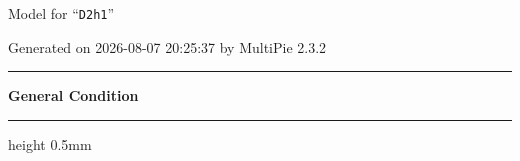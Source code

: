 \documentclass[fleqn,10pt,landscape]{jsarticle}
\begin{document}
\setcounter{MaxMatrixCols}{32}

\renewcommand{\tablename}{Table~}
\renewcommand{\figurename}{Figure~}
\setlength{\baselineskip}{16pt}
\setlength{\parindent}{0pt}
\setlength{\mathindent}{0pt}
\footnotesize
\begin{center}
\LARGE
Model for ``\texttt{D2h1}''
\end{center}
\begin{flushright}
Generated on 2026-08-07 20:25:37 by MultiPie 2.3.2
\end{flushright}
\setlength{\baselineskip}{16pt}
\footnotesize
\vspace{5mm}
\noindent \rule[0.5mm]{5mm}{0.5mm}\hspace{3mm}\textbf{General Condition}\hspace{3mm}\leaders\hrule height 0.5mm\hfill\kern0pt
\vspace{3mm}
\end{document}
